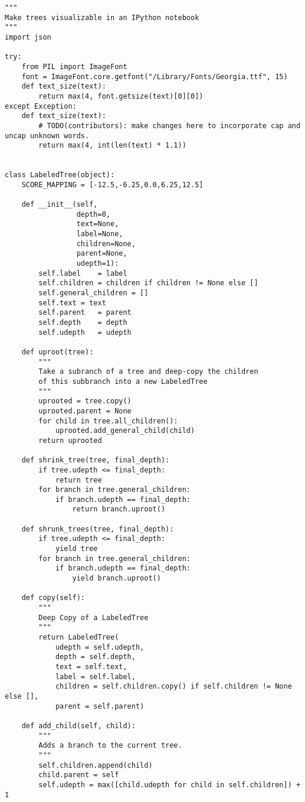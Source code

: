 \begin{lstlisting}[style=app]
"""
Make trees visualizable in an IPython notebook
"""
import json

try:
    from PIL import ImageFont
    font = ImageFont.core.getfont("/Library/Fonts/Georgia.ttf", 15)
    def text_size(text):
        return max(4, font.getsize(text)[0][0])
except Exception:
    def text_size(text):
        # TODO(contributors): make changes here to incorporate cap and uncap unknown words.
        return max(4, int(len(text) * 1.1))


class LabeledTree(object):
    SCORE_MAPPING = [-12.5,-6.25,0.0,6.25,12.5]

    def __init__(self,
                 depth=0,
                 text=None,
                 label=None,
                 children=None,
                 parent=None,
                 udepth=1):
        self.label    = label
        self.children = children if children != None else []
        self.general_children = []
        self.text = text
        self.parent   = parent
        self.depth    = depth
        self.udepth   = udepth

    def uproot(tree):
        """
        Take a subranch of a tree and deep-copy the children
        of this subbranch into a new LabeledTree
        """
        uprooted = tree.copy()
        uprooted.parent = None
        for child in tree.all_children():
            uprooted.add_general_child(child)
        return uprooted

    def shrink_tree(tree, final_depth):
        if tree.udepth <= final_depth:
            return tree
        for branch in tree.general_children:
            if branch.udepth == final_depth:
                return branch.uproot()

    def shrunk_trees(tree, final_depth):
        if tree.udepth <= final_depth:
            yield tree
        for branch in tree.general_children:
            if branch.udepth == final_depth:
                yield branch.uproot()

    def copy(self):
        """
        Deep Copy of a LabeledTree
        """
        return LabeledTree(
            udepth = self.udepth,
            depth = self.depth,
            text = self.text,
            label = self.label,
            children = self.children.copy() if self.children != None else [],
            parent = self.parent)

    def add_child(self, child):
        """
        Adds a branch to the current tree.
        """
        self.children.append(child)
        child.parent = self
        self.udepth = max([child.udepth for child in self.children]) + 1


\end{lstlisting}

